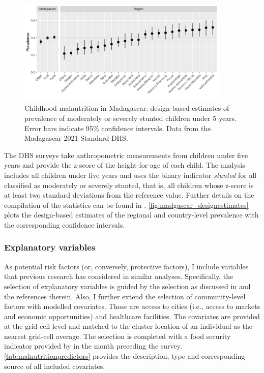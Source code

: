 \begin{figure}[!t]
	\centering
	\includegraphics[width=0.9\textwidth, keepaspectratio]{figures/madagascar_designestimates.png}
	\caption{Childhood malnutrition in Madagascar: design-based estimates of prevalence of moderately or severely stunted children under 5 years. Error bars indicate 95\% confidence intervals. Data from the Madagascar 2021 Standard DHS.}
	\label{fig:madgascar_designestimates}
\end{figure}

The DHS surveys take anthropometric measurements from children under five years and provide the z-score of the height-for-age of each child. The analysis includes all children under five years and uses the binary indicator \textit{stunted} for all classified as moderately or severely stunted, that is, all children whose z-score is at least two standard deviations from the reference value. Further details on the compilation of the statistics can be found in \textcite{croftGuideDHSStatistics2020}. \autoref{fig:madgascar_designestimates} plots the design-based estimates of the regional and country-level prevalence with the corresponding confidence intervals. 


\subsubsection*{Explanatory variables}

As potential risk factors (or, conversely, protective factors), I include variables that previous research has considered in similar analyses. Specifically, the selection of explanatory variables is guided by the selection as discussed in \textcite{fenskeIdentifyingRiskFactors2011, fenskeUnderstandingChildStunting2013} and the references therein. Also, I further extend the selection of community-level factors with modelled covariates. Those are access to cities (i.e., access to markets and economic opportunities) and healthcare facilities. The covariates are provided at the grid-cell level and matched to the cluster location of an individual as the nearest grid-cell average. The selection is completed with a food security indicator provided by \textcite{fewsnetFEWSNETData2022} in the month preceding the survey. \autoref{tab:malnutritionpredictors} provides the description, type and corresponding source of all included covariates.

